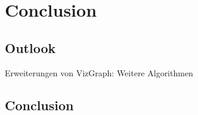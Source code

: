 \chapter{Conclusion}\label{sec:con}
\section{Outlook}\label{sec:outlook}
Erweiterungen von VizGraph: 
Weitere Algorithmen

\section{Conclusion}\label{sec:conclusion}
